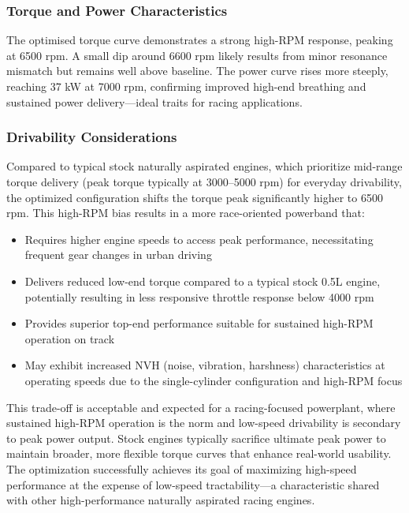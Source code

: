 \subsubsection{Torque and Power Characteristics}

The optimised torque curve demonstrates a strong high-RPM response, peaking at 6500 rpm. A small dip around 6600 rpm likely results from minor resonance mismatch but remains well above baseline. The power curve rises more steeply, reaching 37 kW at 7000 rpm, confirming improved high-end breathing and sustained power delivery—ideal traits for racing applications.

\subsubsection{Drivability Considerations}

Compared to typical stock naturally aspirated engines, which prioritize mid-range torque delivery (peak torque typically at 3000--5000 rpm) for everyday drivability, the optimized configuration shifts the torque peak significantly higher to 6500 rpm. This high-RPM bias results in a more race-oriented powerband that:

\begin{itemize}
    \item Requires higher engine speeds to access peak performance, necessitating frequent gear changes in urban driving
    \item Delivers reduced low-end torque compared to a typical stock 0.5L engine, potentially resulting in less responsive throttle response below 4000 rpm
    \item Provides superior top-end performance suitable for sustained high-RPM operation on track
    \item May exhibit increased NVH (noise, vibration, harshness) characteristics at operating speeds due to the single-cylinder configuration and high-RPM focus
\end{itemize}

This trade-off is acceptable and expected for a racing-focused powerplant, where sustained high-RPM operation is the norm and low-speed drivability is secondary to peak power output. Stock engines typically sacrifice ultimate peak power to maintain broader, more flexible torque curves that enhance real-world usability. The optimization successfully achieves its goal of maximizing high-speed performance at the expense of low-speed tractability—a characteristic shared with other high-performance naturally aspirated racing engines.


